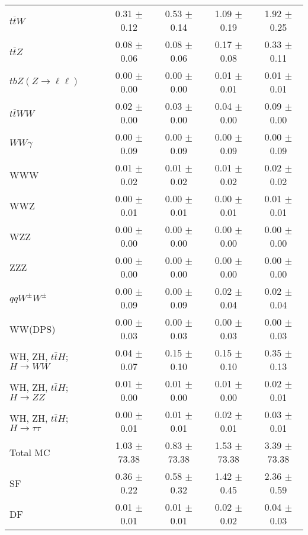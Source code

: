 \begin{tabular}{l|cccc}
                   $t\overline{t}W$ &  0.31 $\pm$  0.12 &  0.53 $\pm$  0.14 &  1.09 $\pm$  0.19 &  1.92 $\pm$  0.25 \\
                   $t\overline{t}Z$ &  0.08 $\pm$  0.06 &  0.08 $\pm$  0.06 &  0.17 $\pm$  0.08 &  0.33 $\pm$  0.11 \\
    $tbZ (Z \rightarrow \ell \ell)$ &  0.00 $\pm$  0.00 &  0.00 $\pm$  0.00 &  0.01 $\pm$  0.01 &  0.01 $\pm$  0.01 \\
                  $t\overline{t}WW$ &  0.02 $\pm$  0.00 &  0.03 $\pm$  0.00 &  0.04 $\pm$  0.00 &  0.09 $\pm$  0.00 \\
                         $WW\gamma$ &  0.00 $\pm$  0.09 &  0.00 $\pm$  0.09 &  0.00 $\pm$  0.09 &  0.00 $\pm$  0.09 \\
                                WWW &  0.01 $\pm$  0.02 &  0.01 $\pm$  0.02 &  0.01 $\pm$  0.02 &  0.02 $\pm$  0.02 \\
                                WWZ &  0.00 $\pm$  0.01 &  0.00 $\pm$  0.01 &  0.00 $\pm$  0.01 &  0.01 $\pm$  0.01 \\
                                WZZ &  0.00 $\pm$  0.00 &  0.00 $\pm$  0.00 &  0.00 $\pm$  0.00 &  0.00 $\pm$  0.00 \\
                                ZZZ &  0.00 $\pm$  0.00 &  0.00 $\pm$  0.00 &  0.00 $\pm$  0.00 &  0.00 $\pm$  0.00 \\
                 $qqW^{\pm}W^{\pm}$ &  0.00 $\pm$  0.09 &  0.00 $\pm$  0.09 &  0.02 $\pm$  0.04 &  0.02 $\pm$  0.04 \\
                            WW(DPS) &  0.00 $\pm$  0.03 &  0.00 $\pm$  0.03 &  0.00 $\pm$  0.03 &  0.00 $\pm$  0.03 \\
WH, ZH, $t\bar{t}H$; $H \rightarrow WW$ &  0.04 $\pm$  0.07 &  0.15 $\pm$  0.10 &  0.15 $\pm$  0.10 &  0.35 $\pm$  0.13 \\
WH, ZH, $t\bar{t}H$; $H \rightarrow ZZ$ &  0.01 $\pm$  0.00 &  0.01 $\pm$  0.00 &  0.01 $\pm$  0.00 &  0.02 $\pm$  0.01 \\
WH, ZH, $t\bar{t}H$; $H \rightarrow \tau\tau$ &  0.00 $\pm$  0.01 &  0.01 $\pm$  0.01 &  0.02 $\pm$  0.01 &  0.03 $\pm$  0.01 \\
\hline\hline
                           Total MC &  1.03 $\pm$ 73.38 &  0.83 $\pm$ 73.38 &  1.53 $\pm$ 73.38 &  3.39 $\pm$ 73.38 \\
\hline
                                 SF &  0.36 $\pm$  0.22 &  0.58 $\pm$  0.32 &  1.42 $\pm$  0.45 &  2.36 $\pm$  0.59 \\
                                 DF &  0.01 $\pm$  0.01 &  0.01 $\pm$  0.01 &  0.02 $\pm$  0.02 &  0.04 $\pm$  0.03 \\

\end{tabular}
